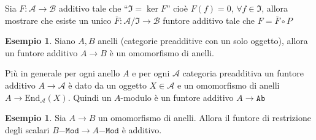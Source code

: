 \documentclass[notitlepage]{report}
\newcounter{theo}[section]\setcounter{theo}{0}
\newcounter{excounter}[section]\setcounter{excounter}{0}
\numberwithin{equation}{section}
\theoremstyle{plain}
\theoremstyle{definition}
\newtheorem{example}[excounter]{Esempio}
\theoremstyle{remark}
\begin{document}
\begin{eser}{}
    Sia \(F : \mathcal{A} \to \mathcal{B}\) additivo tale che ``\(\mathfrak{I} = \ker F\)'' cioè \(F{(f)} = 0 \), \(\forall f \in \mathfrak{I}\), allora mostrare che esiste un unico \(\overline{F} : \mathcal{A}/\mathfrak{I} \to \mathcal{B}\) funtore additivo tale che \(F = \overline{F} \circ P\) 
\end{eser}

\begin{example}{}
    Siano \(A, B\) anelli (categorie preadditive con un solo oggetto), allora un
    funtore additivo \(A\to B\) è un omomorfismo di anelli.

    Più in generale per ogni anello \(A\) e per ogni \(\mathcal{A}\) categoria
    preadditiva un funtore additivo \( A \to \mathcal{A}\) è dato da un oggetto
    \(X \in \mathcal{A}\) e un omomorfismo di anelli \(A \to \mathrm{End}_\mathcal{A}{(X)}\).
    Quindi un \(A\)-modulo è un funtore additivo \(A \to \mathtt{Ab}\) 
\end{example}

\begin{example}{}
    Sia \(A\to B\) un omomorfismo di anelli. Allora il funtore di restrizione
    degli scalari \(B\mathtt{-Mod} \to A\mathtt{-Mod}\) è additivo.
\end{example}
\end{document}
